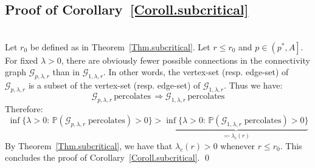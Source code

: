 \documentclass[10pt,a4paper]{amsart}
\theoremstyle{exampstyle}
\theoremstyle{exampnotations}
\begin{document}
\subsection{Proof of Corollary~\ref{Coroll.subcritical}}\mbox{}\\
Let $r_0$ be defined as in Theorem~\ref{Thm.subcritical}. Let $r \leq r_0$ and $p \in \left( p^{*},A \right]$. For fixed $\lambda > 0$, there are obviously fewer possible connections in the connectivity graph $\mathcal{G}_{p,\lambda,r}$ than in $\mathcal{G}_{1,\lambda,r}$. In other words, the vertex-set (resp. edge-set) of $\mathcal{G}_{p,\lambda,r}$ is a subset of the vertex-set (resp. edge-set) of $\mathcal{G}_{1, \lambda,r}$. Thus we have:
\begin{equation*}
    \mathcal{G}_{p,\lambda,r} \, \text{percolates} \,  \Rightarrow \mathcal{G}_{1,\lambda,r} \, \text{percolates}
\end{equation*}
Therefore:
\begin{equation*}
    \inf \lbrace \lambda > 0 : \, \mathbb{P}(\mathcal{G}_{p,\lambda,r} \; \text{percolates}) > 0 \rbrace >   \underbrace{\inf \lbrace \lambda > 0 : \, \mathbb{P}(\mathcal{G}_{1,\lambda,r} \; \text{percolates}) > 0 \rbrace}_{ \eqqcolon \lambda_c(r)}
\end{equation*}
By Theorem~\ref{Thm.subcritical}, we have that $\lambda_c(r) > 0$ whenever $r \leq r_0$. This concludes the proof of Corollary~\ref{Coroll.subcritical}. \qed
\end{document}
